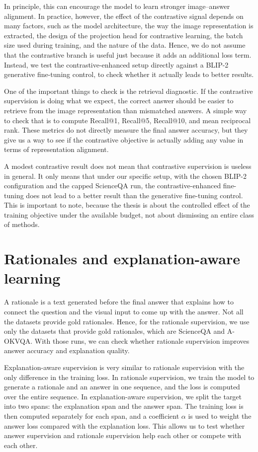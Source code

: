 In principle, this can encourage the model to learn stronger image--answer alignment.
In practice, however, the effect of the contrastive signal depends on many factors, such as the model architecture, the way the image representation is extracted,
the design of the projection head for contrastive learning, the batch size used during training, and the nature of the data.
Hence, we do not assume that the contrastive branch is useful just because it adds an additional loss term.
Instead, we test the contrastive-enhanced setup directly against a BLIP-2 generative fine-tuning control, to check whether it actually leads to better results.

One of the important things to check is the retrieval diagnostic.
If the contrastive supervision is doing what we expect, the correct answer should be easier to retrieve from the image representation than mismatched answers.
A simple way to check that is to compute Recall@1, Recall@5, Recall@10, and mean reciprocal rank.
These metrics do not directly measure the final answer accuracy, but they give us a way to see if the contrastive objective is actually adding any value in terms of representation alignment.

A modest contrastive result does not mean that contrastive supervision is useless in general.
It only means that under our specific setup, with the chosen BLIP-2 configuration and the capped ScienceQA run, the contrastive-enhanced fine-tuning
does not lead to a better result than the generative fine-tuning control.
This is important to note, because the thesis is about the controlled effect of the training objective under the available budget, not about dismissing an entire class of methods.


\section{Rationales and explanation-aware learning}
A rationale is a text generated before the final answer that explains how to connect the question and the visual input to come up with the answer.
Not all the datasets provide gold rationales.
Hence, for the rationale supervision, we use only the datasets that provide gold rationales, which are ScienceQA and A-OKVQA.
With those runs, we can check whether rationale supervision improves answer accuracy and explanation quality.

Explanation-aware supervision is very similar to rationale supervision with the only difference in the training loss.
In rationale supervision, we train the model to generate a rationale and an answer in one sequence, and the loss is computed over the entire sequence.
In explanation-aware supervision, we split the target into two spans: the explanation span and the answer span.
The training loss is then computed separately for each span, and a coefficient $\alpha$ is used to weight the answer loss compared with the explanation loss.
This allows us to test whether answer supervision and rationale supervision help each other or compete with each other.

